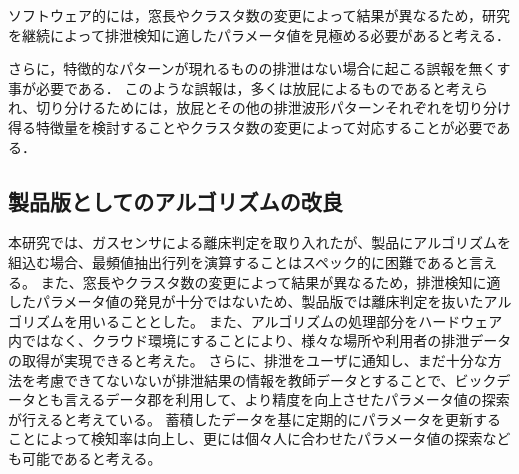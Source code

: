 ソフトウェア的には，窓長やクラスタ数の変更によって結果が異なるため，研究を継続によって排泄検知に適したパラメータ値を見極める必要があると考える．

さらに，特徴的なパターンが現れるものの排泄はない場合に起こる誤報を無くす事が必要である．
このような誤報は，多くは放屁によるものであると考えられ、切り分けるためには，放屁とその他の排泄波形パターンそれぞれを切り分け得る特徴量を検討することやクラスタ数の変更によって対応することが必要である．

\subsection{製品版としてのアルゴリズムの改良}\label{chap:3.3.5}
本研究では、ガスセンサによる離床判定を取り入れたが、製品にアルゴリズムを組込む場合、最頻値抽出行列を演算することはスペック的に困難であると言える。
また、窓長やクラスタ数の変更によって結果が異なるため，排泄検知に適したパラメータ値の発見が十分ではないため、製品版では離床判定を抜いたアルゴリズムを用いることとした。
また、アルゴリズムの処理部分をハードウェア内ではなく、クラウド環境にすることにより、様々な場所や利用者の排泄データの取得が実現できると考えた。
さらに、排泄をユーザに通知し、まだ十分な方法を考慮できてないないが排泄結果の情報を教師データとすることで、ビックデータとも言えるデータ郡を利用して、より精度を向上させたパラメータ値の探索が行えると考えている。
蓄積したデータを基に定期的にパラメータを更新することによって検知率は向上し、更には個々人に合わせたパラメータ値の探索なども可能であると考える。
